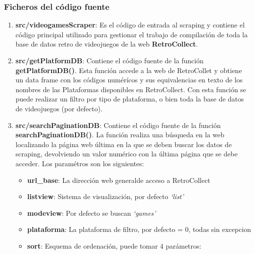 \documentclass[]{article}
\providecommand{\tightlist}{%
  \setlength{\itemsep}{0pt}\setlength{\parskip}{0pt}}
\begin{document}
\clearpage

\subsubsection{Ficheros del código
fuente}\label{ficheros-del-codigo-fuente}

\begin{enumerate}
\def\labelenumi{\arabic{enumi}.}
\tightlist
\item
  \textbf{src/videogamesScraper}: Es el código de entrada al scraping y
  contiene el código principal utilizado para gestionar el trabajo de
  compilación de toda la base de datos retro de videojuegos de la web
  \textbf{RetroCollect}.
\item
  \textbf{src/getPlatformDB}: Contiene el código fuente de la función
  \textbf{getPlatformDB()}. Esta función accede a la web de RetroCollet
  y obtiene un data frame con los códigos numérícos y sus equivalencias
  en texto de los nombres de las Plataformas disponibles en
  RetroCollect. Con esta función se puede realizar un filtro por tipo de
  plataforma, o bien toda la base de datos de videojuegos (por defecto).
\item
  \textbf{src/searchPaginationDB}: Contiene el código fuente de la
  función \textbf{searchPaginationDB()}. La función realiza una búsqueda
  en la web localizando la página web última en la que se deben buscar
  los datos de scraping, devolviendo un valor numérico con la última
  página que se debe acceder. Los paramétros son los siguientes:

  \begin{itemize}
  \tightlist
  \item
    \textbf{url\_base}: La dirección web generalde acceso a RetroCollect
  \item
    \textbf{listview}: Sistema de visualización, por defecto
    \emph{`list'}
  \item
    \textbf{modeview}: Por defecto se buscan \emph{`games'}
  \item
    \textbf{plataforma}: La plataforma de filtro, por defecto = 0, todas
    sin excepcion
  \item
    \textbf{sort}: Esquema de ordenación, puede tomar 4 parámetros:


\end{itemize}
\end{enumerate}
\end{document}
